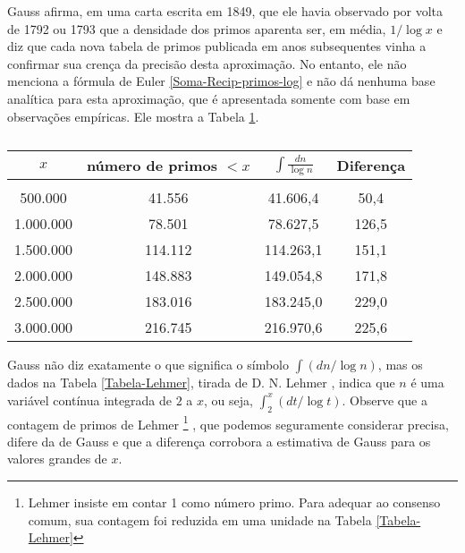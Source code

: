     Gauss afirma, em uma carta escrita em 1849, que ele havia observado por volta de 1792 ou 1793 que a densidade dos primos aparenta ser, em média, $1/\log x$ e diz que cada nova tabela de primos publicada em anos subsequentes vinha a confirmar sua crença da precisão desta aproximação. No entanto, ele não menciona a fórmula de Euler \eqref{Soma-Recip-primos-log} e não dá nenhuma base analítica para esta aproximação, que é apresentada somente com base em observações empíricas. Ele mostra a Tabela \ref{Tabela-Gauss}.
    \begin{table}[H]
        \centering
        \begin{tabular}{cccc}
             $x$& número de primos $< x$ & $\displaystyle \int \frac{dn}{\log n}$ &  Diferença
             \\[0.45cm]
             \hline
             \\[-0.3cm]
             500.000   & 41.556  & 41.606,4  & 50,4 \\[0.1cm]
             1.000.000 & 78.501  & 78.627,5  & 126,5 \\[0.1cm]
             1.500.000 & 114.112 & 114.263,1 & 151,1 \\[0.1cm]
             2.000.000 & 148.883 & 149.054,8 & 171,8 \\[0.1cm]
             2.500.000 & 183.016 & 183.245,0 & 229,0 \\[0.1cm]
             3.000.000 & 216.745 & 216.970,6 & 225,6
        \end{tabular}
        \caption{}
        \label{Tabela-Gauss}
    \end{table}
    
    Gauss não diz exatamente o que significa o símbolo $\int (dn/\log n)$, mas os dados na Tabela \ref{Tabela-Lehmer}, tirada de D. N. Lehmer \cite{Lehmer13}, indica que $n$ é uma variável contínua integrada de $2$ a $x$, ou seja, $\int_{2}^{x}(dt/\log t)$. Observe que a contagem de primos de Lehmer
    \footnote{Lehmer insiste em contar 1 como número primo. Para adequar ao consenso comum, sua contagem foi reduzida em uma unidade na Tabela \ref{Tabela-Lehmer}}
    , que podemos seguramente considerar precisa, difere da de Gauss e que a diferença corrobora a estimativa de Gauss para os valores grandes de $x$.
    

